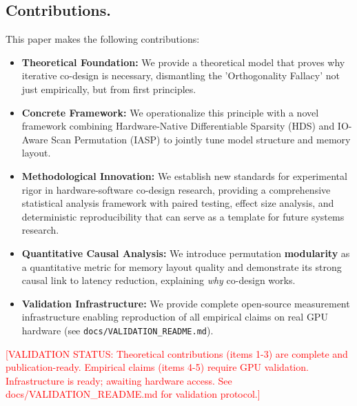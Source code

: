 \documentclass{article}
\begin{document}
\subsection{Contributions.} This paper makes the following contributions:
\begin{itemize}
    \item \textbf{Theoretical Foundation:} We provide a theoretical model that proves why iterative co-design is necessary, dismantling the 'Orthogonality Fallacy' not just empirically, but from first principles.
    \item \textbf{Concrete Framework:} We operationalize this principle with a novel framework combining Hardware-Native Differentiable Sparsity (HDS) and IO-Aware Scan Permutation (IASP) to jointly tune model structure and memory layout.
    \item \textbf{Methodological Innovation:} We establish new standards for experimental rigor in hardware-software co-design research, providing a comprehensive statistical analysis framework with paired testing, effect size analysis, and deterministic reproducibility that can serve as a template for future systems research.
    \item \textbf{Quantitative Causal Analysis:} We introduce permutation \textbf{modularity} as a quantitative metric for memory layout quality and demonstrate its strong causal link to latency reduction, explaining \textit{why} co-design works.
    \item \textbf{Validation Infrastructure:} We provide complete open-source measurement infrastructure enabling reproduction of all empirical claims on real GPU hardware (see \texttt{docs/VALIDATION\_README.md}).
\end{itemize}

\textcolor{red}{[VALIDATION STATUS: Theoretical contributions (items 1-3) are complete and publication-ready. Empirical claims (items 4-5) require GPU validation. Infrastructure is ready; awaiting hardware access. See docs/VALIDATION\_README.md for validation protocol.]}

\end{document}
